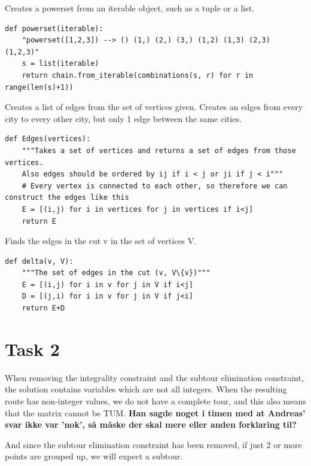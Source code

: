 \documentclass[a4paper,10pt]{article}
\begin{document}
Creates a powerset from an iterable object, such as a tuple or a list.

\begin{lstlisting}
def powerset(iterable):
    "powerset([1,2,3]) --> () (1,) (2,) (3,) (1,2) (1,3) (2,3) (1,2,3)"
    s = list(iterable)
    return chain.from_iterable(combinations(s, r) for r in range(len(s)+1))
\end{lstlisting}

Creates a list of edges from the set of vertices given. Creates an edges from every city to every other city, but only 1 edge between the same cities.

\begin{lstlisting}
def Edges(vertices):
    """Takes a set of vertices and returns a set of edges from those vertices. 
    Also edges should be ordered by ij if i < j or ji if j < i"""
    # Every vertex is connected to each other, so therefore we can construct the edges like this
    E = [(i,j) for i in vertices for j in vertices if i<j]
    return E
\end{lstlisting}

Finds the edges in the cut v in the set of vertices V.

\begin{lstlisting}
def delta(v, V):
    """The set of edges in the cut (v, V\{v})"""
    E = [(i,j) for i in v for j in V if i<j]
    D = [(j,i) for i in v for j in V if j<i]
    return E+D
\end{lstlisting}


\newpage
\section*{Task 2}

When removing the integrality constraint and the subtour elimination constraint, the solution contains variables which are not all integers. When the resulting route has non-integer values, we do not have a complete tour, and this also means that the matrix cannot be TUM. \textbf{Han sagde noget i timen med at Andreas' svar ikke var 'nok', så måske der skal mere eller anden forklaring til?}

And since the subtour elimination constraint has been removed, if just 2 or more points are grouped up, we will expect a subtour.

\newpage
\end{document}
